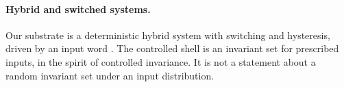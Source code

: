 \paragraph{Hybrid and switched systems.}
Our substrate is a deterministic hybrid system with switching and hysteresis, driven by an input word \cite{GoebelSanfeliceTeel2012Hybrid}. The controlled shell is an invariant set for prescribed inputs, in the spirit of controlled invariance. It is not a statement about a random invariant set under an input distribution.
